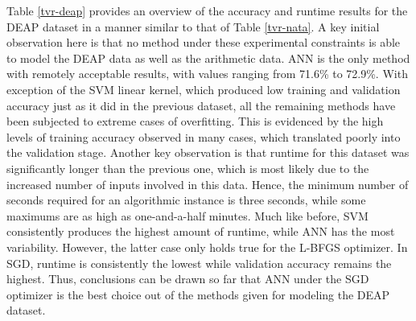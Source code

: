 \documentclass[12pt]{uthesis-v12}  %
\begin{document}
Table \ref{tvr-deap} provides an overview of the accuracy and runtime results for the DEAP dataset in a manner similar to that of Table \ref{tvr-nata}. A key initial observation here is that no method under these experimental constraints is able to model the DEAP data as well as the arithmetic data. ANN is the only method with remotely acceptable results, with values ranging from 71.6\% to 72.9\%. With exception of the SVM linear kernel, which produced low training and validation accuracy just as it did in the previous dataset, all the remaining methods have been subjected to extreme cases of overfitting. This is evidenced by the high levels of training accuracy observed in many cases, which translated poorly into the validation stage. Another key observation is that runtime for this dataset was significantly longer than the previous one, which is most likely due to the increased number of inputs involved in this data. Hence, the minimum number of seconds required for an algorithmic instance is three seconds, while some maximums are as high as one-and-a-half minutes. Much like before, SVM consistently produces the highest amount of runtime, while ANN has the most variability. However, the latter case only holds true for the L-BFGS optimizer. In SGD, runtime is consistently the lowest while validation accuracy remains the highest. Thus, conclusions can be drawn so far that ANN under the SGD optimizer is the best choice out of the methods given for modeling the DEAP dataset.
\end{document}
